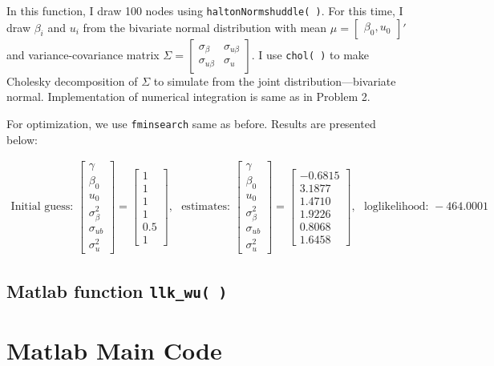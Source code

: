 \documentclass[11pt,letter]{article}
\newcounter{lem}[section] \setcounter{lem}{0}
\newcommand{\bmat}[1]{\begin{bmatrix} #1 \end{bmatrix}}%
\newcommand{\code}[1]{\texttt{#1}}
\begin{document}
In this function, I draw 100 nodes using \code{haltonNormshuddle( )}. For this time, I draw $\beta_i$ and $u_i$ from the bivariate normal distribution with mean $\mu=\bmat{\beta_0, u_0}'$ and variance-covariance matrix $\Sigma = \bmat{\sigma_\beta & \sigma_{u\beta} \\ \sigma_{u\beta} & \sigma_{u}}$. I use \code{chol( )} to make Cholesky decomposition of $\Sigma$ to simulate from the joint distribution---bivariate normal. Implementation of numerical integration is same as in Problem 2.

For optimization, we use \code{fminsearch} same as before. Results are presented below:



\begin{align*}
\text{Initial guess: }
\bmat{\gamma \\ \beta_0  \\ u_0 \\ \sigma_\beta^2 \\ \sigma_{ub}\\ \sigma_u^2} 
=\bmat{1 \\ 1  \\ 1 \\ 1 \\ 0.5 \\ 1}, \ \ \  
\text{estimates: }
\bmat{\gamma \\ \beta_0  \\ u_0 \\ \sigma_\beta^2 \\ \sigma_{ub}\\ \sigma_u^2} 
=\bmat{-0.6815 \\ 3.1877  \\ 1.4710 \\ 1.9226 \\ 0.8068 \\ 1.6458}, \ \ \ 
\text{loglikelihood: }-464.0001
\end{align*}

\subsection*{Matlab function \code{llk\_wu( )}}


\section*{Matlab Main Code}

\end{document}
